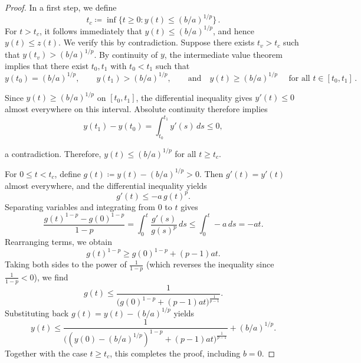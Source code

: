\documentclass[11pt]{article}
\theoremstyle{myplain}
\theoremstyle{mydefinition}
\theoremstyle{remark}
\DeclareMathOperator{\1}{\mathds{1}}
\begin{document}
    \begin{proof}
        In a first step, we define
        \begin{equation*}
            t_c \coloneqq \inf\{t \ge 0 : y(t) \le (b/a)^{1/p}\}\,.
        \end{equation*}
        For $t > t_c$, it follows immediately that $y(t) \le (b/a)^{1/p}$, and hence $y(t) \le z(t)$. We verify this by contradiction. Suppose there exists $t_v > t_c$ such that $y(t_v) > (b/a)^{1/p}$. By continuity of $y$, the intermediate value theorem implies that there exist $t_0, t_1$ with $t_0 < t_1$ such that
        \begin{equation*}
            y(t_0) = (b/a)^{1/p}, \qquad y(t_1) > (b/a)^{1/p}, \qquad \text{and} \quad y(t) \ge (b/a)^{1/p} \quad\text{ for all } t \in [t_0, t_1]\,.
        \end{equation*}
        
        Since $y(t)\geq(b/a)^{1/p}$ on $[t_0,t_1]$, the differential inequality gives $y'(t)\leq0$ almost everywhere on this interval. Absolute continuity therefore implies
        \begin{equation*}
            y(t_1)-y(t_0)=\int_{t_0}^{t_1}y'(s)\,ds\leq0,
        \end{equation*}
        
        a contradiction. Therefore, $y(t) \le (b/a)^{1/p}$ for all $t \ge t_c$.

        For $0 \le t < t_c$, define $g(t) \coloneqq y(t) - (b/a)^{1/p} > 0$. Then $g'(t) = y'(t)$ almost everywhere, and the differential inequality yields
        \begin{equation*}
            g'(t) \le -a\, g(t)^p.
        \end{equation*}
        Separating variables and integrating from $0$ to $t$ gives
        \begin{equation*}
            \frac{g(t)^{1 - p} - g(0)^{1 - p}}{1 - p} = \int_0^t \frac{g'(s)}{g(s)^p}\, ds \le \int_0^t -a\, ds = -a t.
        \end{equation*}
        Rearranging terms, we obtain
        \begin{equation*}
            g(t)^{1 - p} \ge g(0)^{1 - p} + (p - 1)a t.
        \end{equation*}
        Taking both sides to the power of $\tfrac{1}{1 - p}$ (which reverses the inequality since $\tfrac{1}{1 - p} < 0$), we find
        \begin{equation*}
            g(t) \le \frac{1}{\big(g(0)^{1 - p} + (p - 1)a t \big)^{\frac{1}{p - 1}}}.
        \end{equation*}
        Substituting back $g(t) = y(t) - (b/a)^{1/p}$ yields
        \begin{equation*}
            y(t) \le \frac{1}{\big((y(0) - (b/a)^{1/p})^{1 - p} + (p - 1)a t \big)^{\frac{1}{p - 1}}} + (b/a)^{1/p}.
        \end{equation*}
        Together with the case $t\geq t_c$, this completes the proof, including $b=0$.
    \end{proof}
\end{document}
